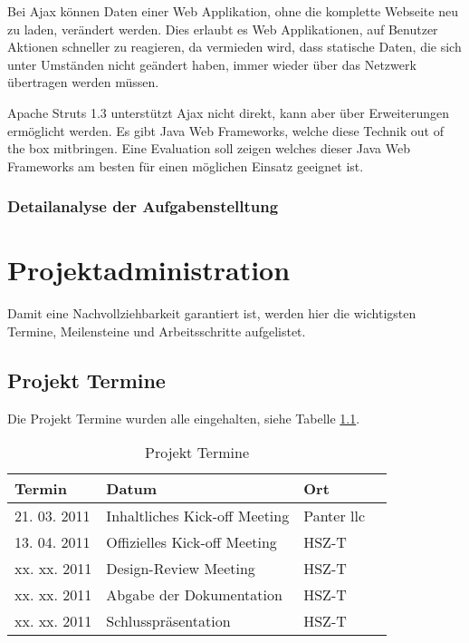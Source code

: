 \documentclass[
11pt, %
a4paper, %
BCOR25mm, %
DIV14, %
footsepline = false, %
headsepline, %
twoside, %
openright,
abstracton, %
listof=totocnumbered, %
bibliography=totocnumbered %
]{scrreprt}
\begin{document}
  Bei \ac{Ajax} können Daten einer Web Applikation, ohne die komplette Webseite
  neu zu laden, verändert werden. Dies erlaubt es Web Applikationen, auf
  Benutzer Aktionen schneller zu reagieren, da vermieden wird, dass statische
  Daten, die sich unter Umständen nicht geändert haben, immer wieder über das
  Netzwerk übertragen werden müssen.
  
  Apache Struts 1.3 unterstützt \ac{Ajax} nicht direkt, kann aber über
  Erweiterungen ermöglicht werden. Es gibt Java Web Frameworks, welche diese
  Technik out of the box mitbringen. Eine Evaluation soll zeigen welches dieser
  Java Web Frameworks am besten für einen möglichen Einsatz geeignet ist.
  
  \subsection{Detailanalyse der Aufgabenstelltung}
  
  \newpage
  
  \chapter{Projektadministration}
  
  Damit eine Nachvollziehbarkeit garantiert ist, werden hier die wichtigsten
  Termine, Meilensteine und Arbeitsschritte aufgelistet.
  
  \section{Projekt Termine}
  
  Die Projekt Termine wurden alle eingehalten, siehe Tabelle \ref{tab:termine}.
  \newline
  
  \begin{table}[h]
    \begin{center}
      \begin{tabular}{lp{7cm}ll}
        \toprule
        Termin & Datum & Ort \\
        \midrule
        21. 03. 2011 & Inhaltliches Kick-off Meeting & Panter llc\\
        13. 04. 2011 & Offizielles Kick-off Meeting & HSZ-T\\
        xx. xx. 2011 & Design-Review Meeting & HSZ-T\\
        xx. xx. 2011 & Abgabe der Dokumentation & HSZ-T\\
        xx. xx. 2011 & Schlusspräsentation & HSZ-T\\
        \bottomrule
      \end{tabular}
      \caption{Projekt Termine}
      \label{tab:termine}
    \end{center}
  \end{table}
  
\end{document}
